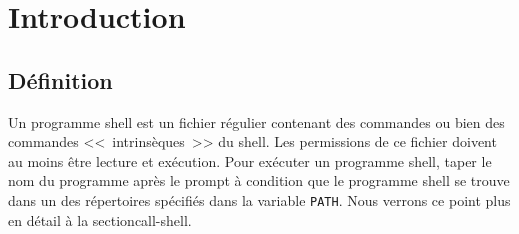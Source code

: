 %
%

\setcounter{remarque-cnt}{1}
\setcounter{example-cnt}{1}
\chapter{Introduction}
\thispagestyle{fancy}

\section{D{\'e}finition}

Un programme shell est un fichier r{\'e}gulier
contenant des commandes {\Unix} ou bien des commandes
<<~intrins{\`e}ques~>> du shell. Les permissions de ce fichier doivent
au moins {\^e}tre lecture et ex{\'e}cution. Pour ex{\'e}cuter un
programme shell, taper le nom du programme apr{\`e}s le prompt {\`a}
condition que le programme shell se trouve dans un des r{\'e}pertoires
sp{\'e}cifi{\'e}s dans la variable 
\texttt{PATH}. Nous verrons ce point plus en d{\'e}tail {\`a} la
section{call-shell}.

